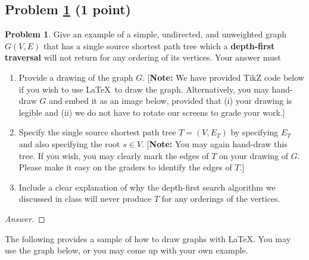 \documentclass[11pt]{article}
\theoremstyle{definition}
\theoremstyle{definition}
\newtheorem{required}{Problem}
\theoremstyle{definition}
\begin{document}
\subsection{Problem \ref{DFS2} (1 point)} 
\begin{required} \label{DFS2}
Give an example of a simple, undirected, and unweighted graph $G(V, E)$ that has a single source shortest path tree which a \textbf{depth-first traversal} will not return for any ordering of its vertices. 
    Your answer must
    \begin{enumerate}[label=(\alph*)]
    	\item Provide a drawing of the graph $G$. [\textbf{Note:} We have provided TikZ code below if you wish to use \LaTeX \ to draw the graph. Alternatively, you may hand-draw $G$ and embed it as an image below, provided that (i) your drawing is legible and (ii) we do not have to rotate our screens to grade your work.]
    	\item Specify the single source shortest path tree $T = (V,E_T)$ by specifying $E_T$ and also specifying the root $s \in V$. [\textbf{Note:} You may again hand-draw this tree. If you wish, you may clearly mark the edges of $T$ on your drawing of $G$. Please make it easy on the graders to identify the edges of $T$.] 
    	\item Include a clear explanation of why the depth-first search algorithm we discussed in class will never produce $T$ for any orderings of the vertices.
    \end{enumerate}

\end{required}

\noindent 
\begin{proof}[Answer]
\end{proof}


\noindent The following provides a sample of how to draw graphs with \LaTeX. You may use the graph below, or you may come up with your own example.
\begin{center}
\end{center}
\end{document}
